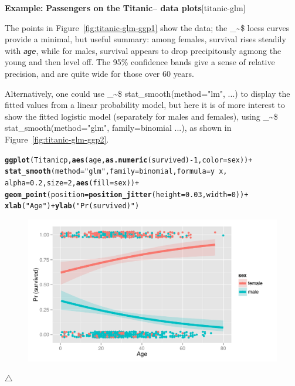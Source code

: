 \documentclass{article}
\makeatletter
\newcommand{\hlnum}[1]{\textcolor[rgb]{0.686,0.059,0.569}{#1}}%
\newcommand{\hlstr}[1]{\textcolor[rgb]{0.192,0.494,0.8}{#1}}%
\newcommand{\hlopt}[1]{\textcolor[rgb]{0,0,0}{#1}}%
\newcommand{\hlstd}[1]{\textcolor[rgb]{0.345,0.345,0.345}{#1}}%
\newcommand{\hlkwc}[1]{\textcolor[rgb]{0.333,0.667,0.333}{#1}}%
\newcommand{\hlkwd}[1]{\textcolor[rgb]{0.737,0.353,0.396}{\textbf{#1}}}%
\newenvironment{kframe}{%
 \def\at@end@of@kframe{}%
 \ifinner\ifhmode%
  \def\at@end@of@kframe{\end{minipage}}%
  \begin{minipage}{\columnwidth}%
 \fi\fi%
 \def\FrameCommand##1{\hskip\@totalleftmargin \hskip-\fboxsep
 \colorbox{shadecolor}{##1}\hskip-\fboxsep
     \hskip-\linewidth \hskip-\@totalleftmargin \hskip\columnwidth}%
 \MakeFramed {\advance\hsize-\width
   \@totalleftmargin\z@ \linewidth\hsize
   \@setminipage}}%
 {\par\unskip\endMakeFramed%
 \at@end@of@kframe}
\newenvironment{knitrout}{}{} %
\newcommand{\figref}[1]{Figure~\ref{#1}}
\newcommand{\var}[1]{\textit{\texttt{#1}}}
\newcommand\code{\bgroup\@makeother\_\@makeother\~\@makeother\$\@codex}
\def\@codex#1{{\normalfont\ttfamily\hyphenchar\font=-1 #1}\egroup}
\newenvironment{Example}[2][unnamed-example]%
  {\medskip\noindent\textbf{\textsf{Example:}}
   \textbf{#2}\hfill [#1]\par\smallskip
  }
  {\hfill $\triangle$}
\makeatother
\begin{document}
\begin{Example}[titanic-glm]{Passengers on the Titanic-- data plots}
\begin{knitrout}
\end{knitrout}
The points in \figref{fig:titanic-glm-ggp1} show the data; the \code{loess}
curves provide a minimal, but useful summary: among females, survival
rises steadily with \var{age}, while for males, survival appears to
drop precipitously agmong the young and then level off.  The 95\% confidence
bands give a sense of relative precision, and are quite wide for those
over 60 years.

Alternatively, one could use \code{stat\_smooth(method="lm", ...)}
to display the fitted values from a linear probability model,
but here it is of more interest to show the fitted logistic model
(separately for males and females), using
\code{stat\_smooth(method="glm", family=binomial ...)}, as shown in
\figref{fig:titanic-glm-ggp2}.

\begin{knitrout}
\color{fgcolor}\begin{kframe}
\begin{alltt}
\hlkwd{ggplot}\hlstd{(Titanicp,} \hlkwd{aes}\hlstd{(age,} \hlkwd{as.numeric}\hlstd{(survived)}\hlopt{-}\hlnum{1}\hlstd{,} \hlkwc{color}\hlstd{=sex))} \hlopt{+}
  \hlkwd{stat_smooth}\hlstd{(}\hlkwc{method}\hlstd{=}\hlstr{"glm"}\hlstd{,} \hlkwc{family}\hlstd{=binomial,} \hlkwc{formula}\hlstd{=y}\hlopt{~}\hlstd{x,}
              \hlkwc{alpha}\hlstd{=}\hlnum{0.2}\hlstd{,} \hlkwc{size}\hlstd{=}\hlnum{2}\hlstd{,} \hlkwd{aes}\hlstd{(}\hlkwc{fill}\hlstd{=sex))} \hlopt{+}
  \hlkwd{geom_point}\hlstd{(}\hlkwc{position}\hlstd{=}\hlkwd{position_jitter}\hlstd{(}\hlkwc{height}\hlstd{=}\hlnum{0.03}\hlstd{,} \hlkwc{width}\hlstd{=}\hlnum{0}\hlstd{))} \hlopt{+}
  \hlkwd{xlab}\hlstd{(}\hlstr{"Age"}\hlstd{)} \hlopt{+} \hlkwd{ylab}\hlstd{(}\hlstr{"Pr (survived)"}\hlstd{)}
\end{alltt}
\end{kframe}\begin{figure}[hb]

{\centering \includegraphics[width=.6\linewidth]{figure/titanic-glm-ggp2-1} 

}
\end{figure}
\end{knitrout}
\end{Example}
\end{document}
